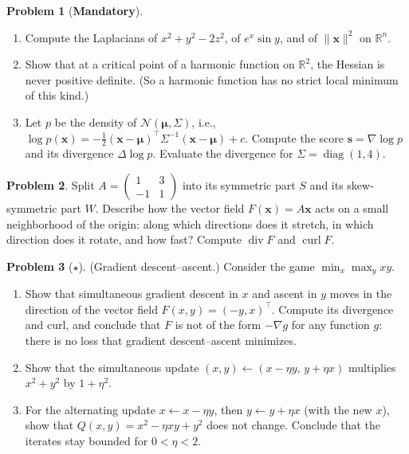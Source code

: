 \documentclass[11pt]{article}
\theoremstyle{definition}
\newtheorem{problem}{Problem}[section]
\newcommand{\mandatory}{\textcolor{red!70!black}{\textbf{Mandatory}}}
\newcommand{\norm}[1]{\lVert #1 \rVert}
\DeclareMathOperator{\diag}{diag}
\DeclareMathOperator{\Div}{div}
\DeclareMathOperator{\curl}{curl}
\begin{document}
\begin{problem}[\mandatory]\label{pr:laplacian}
    \begin{enumerate}[label=(\alph*)]
        \item Compute the Laplacians of $x^2 + y^2 - 2z^2$, of $e^x\sin y$, and of $\norm{\mathbf{x}}^2$ on $\mathbb{R}^n$.
        \item Show that at a critical point of a harmonic function on $\mathbb{R}^2$, the Hessian is never positive definite. (So a harmonic function has no strict local minimum of this kind.)
        \item Let $p$ be the density of $\mathcal{N}(\boldsymbol{\mu}, \Sigma)$, i.e., $\log p(\mathbf{x}) = -\frac{1}{2}(\mathbf{x} - \boldsymbol{\mu})^\top\Sigma^{-1}(\mathbf{x} - \boldsymbol{\mu}) + c$. Compute the score $\mathbf{s} = \nabla\log p$ and its divergence $\Delta\log p$. Evaluate the divergence for $\Sigma = \diag(1, 4)$.
    \end{enumerate}
\end{problem}

\begin{problem}\label{pr:stretch-rotate}
    Split $A = \begin{pmatrix} 1 & 3 \\ -1 & 1 \end{pmatrix}$ into its symmetric part $S$ and its skew-symmetric part $W$. Describe how the vector field $F(\mathbf{x}) = A\mathbf{x}$ acts on a small neighborhood of the origin: along which directions does it stretch, in which direction does it rotate, and how fast? Compute $\Div F$ and $\curl F$.
\end{problem}

\begin{problem}[$\star$]\label{pr:gda}
    (Gradient descent--ascent.) Consider the game $\min_x\max_y xy$.
    \begin{enumerate}[label=(\alph*)]
        \item Show that simultaneous gradient descent in $x$ and ascent in $y$ moves in the direction of the vector field $F(x, y) = (-y, x)^\top$. Compute its divergence and curl, and conclude that $F$ is not of the form $-\nabla g$ for any function $g$: there is no loss that gradient descent--ascent minimizes.
        \item Show that the simultaneous update $(x, y) \leftarrow (x - \eta y, \, y + \eta x)$ multiplies $x^2 + y^2$ by $1 + \eta^2$.
        \item For the alternating update $x \leftarrow x - \eta y$, then $y \leftarrow y + \eta x$ (with the new $x$), show that $Q(x, y) = x^2 - \eta xy + y^2$ does not change. Conclude that the iterates stay bounded for $0 < \eta < 2$.
    \end{enumerate}
\end{problem}
\end{document}
